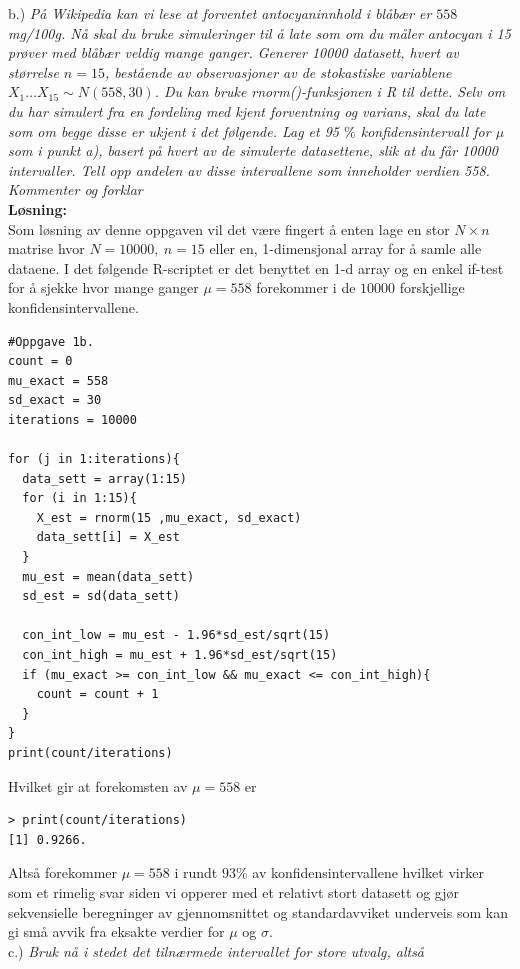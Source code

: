 \documentclass[12pt,
               a4paper,
               article,
               oneside,
               oldfontcommands,
               norsk]{memoir}
\begin{document}
b.)
\emph{På Wikipedia kan vi lese at forventet antocyaninnhold i blåbær er $558$
mg/100g. Nå skal du bruke simuleringer til å late som om du måler antocyan i 15 prøver med blåbær veldig mange ganger. Generer 10000 datasett,
hvert av størrelse $n = 15$, bestående av observasjoner av de stokastiske
variablene $X_{1} \ldots X_{15} \sim N(558, 30)$. Du kan bruke rnorm()-funksjonen i R til dette. Selv om du har simulert fra en fordeling med kjent forventning og varians, skal du late som om begge disse er ukjent i det følgende. Lag et 95 $\%$ konfidensintervall for $\mu$ som i punkt a), basert på hvert av de simulerte datasettene, slik at du får 10000 intervaller. Tell opp andelen av disse intervallene som inneholder verdien 558. Kommenter og forklar}
\vspace{4mm}\\ 
\textbf{Løsning:}\vspace{4mm}\\
Som løsning av denne oppgaven vil det være fingert å enten lage en stor $N \times n$ matrise hvor $N = 10000, \ n = 15$ eller en, 1-dimensjonal array for å samle alle dataene. I det følgende R-scriptet er det benyttet en 1-d array og en enkel if-test for å sjekke hvor mange ganger $\mu = 558$ forekommer i de $10000$ forskjellige konfidensintervallene.
\begin{lstlisting}
#Oppgave 1b.
count = 0
mu_exact = 558
sd_exact = 30
iterations = 10000

for (j in 1:iterations){
  data_sett = array(1:15)
  for (i in 1:15){
    X_est = rnorm(15 ,mu_exact, sd_exact)
    data_sett[i] = X_est
  }
  mu_est = mean(data_sett)
  sd_est = sd(data_sett)
  
  con_int_low = mu_est - 1.96*sd_est/sqrt(15)
  con_int_high = mu_est + 1.96*sd_est/sqrt(15)
  if (mu_exact >= con_int_low && mu_exact <= con_int_high){
    count = count + 1
  }
}
print(count/iterations)
    \end{lstlisting}
Hvilket gir at forekomsten av $\mu = 558$ er 
\begin{verbatim}
> print(count/iterations)
[1] 0.9266.
\end{verbatim}
Altså forekommer $\mu = 558$ i rundt $93 \%$ av konfidensintervallene hvilket virker som et rimelig svar siden vi opperer med et relativt stort datasett og gjør sekvensielle beregninger av gjennomsnittet og standardavviket underveis som kan gi små avvik fra eksakte verdier for $\mu$ og $\sigma$.\vspace{4mm}\\
c.) \emph{Bruk nå i stedet det tilnærmede intervallet for store utvalg, altså}
\end{document}
